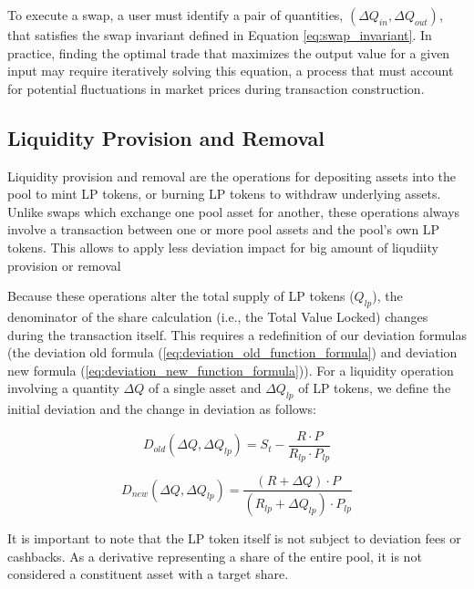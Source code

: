 To execute a swap, a user must identify a pair of quantities, $(\Delta Q_{in}, \Delta Q_{out})$, that satisfies the swap invariant defined in Equation \ref{eq:swap_invariant}. In practice, finding the optimal trade that maximizes the output value for a given input may require iteratively solving this equation, a process that must account for potential fluctuations in market prices during transaction construction.

\subsection{Liquidity Provision and Removal}

Liquidity provision and removal are the operations for depositing assets into the pool to mint LP tokens, or burning LP tokens to withdraw underlying assets. Unlike swaps which exchange one pool asset for another, these operations always involve a transaction between one or more pool assets and the pool's own LP tokens. This allows to apply less deviation impact for big amount of liqudiity provision or removal

Because these operations alter the total supply of LP tokens ($Q_{lp}$), the denominator of the share calculation (i.e., the Total Value Locked) changes during the transaction itself. This requires a redefinition of our deviation formulas (the deviation old formula (\ref{eq:deviation_old_function_formula}) and deviation new formula (\ref{eq:deviation_new_function_formula})). For a liquidity operation involving a quantity $\Delta Q$ of a single asset and $\Delta Q_{lp}$ of LP tokens, we define the initial deviation and the change in deviation as follows:

\begin{equation}
	\label{eq:old_deviation_function_formula_for_lp}
	D_{old}(\Delta Q, \Delta Q_{lp}) = S_t - \frac{R \cdot P}{R_{lp} \cdot P_{lp}}
\end{equation}	

\begin{equation}
	\label{eq:deviation_delta_function_formula_for_lp}
	D_{new}(\Delta Q, \Delta Q_{lp}) = \frac{(R + \Delta Q) \cdot P}{(R_{lp} + \Delta Q_{lp}) \cdot P_{lp}} 
\end{equation}	

It is important to note that the LP token itself is not subject to deviation fees or cashbacks. As a derivative representing a share of the entire pool, it is not considered a constituent asset with a target share.

